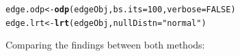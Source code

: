 \documentclass{article}\usepackage[]{graphicx}\usepackage[]{color}
\makeatletter
\newcommand{\hlnum}[1]{\textcolor[rgb]{0.686,0.059,0.569}{#1}}%
\newcommand{\hlstr}[1]{\textcolor[rgb]{0.192,0.494,0.8}{#1}}%
\newcommand{\hlstd}[1]{\textcolor[rgb]{0.345,0.345,0.345}{#1}}%
\newcommand{\hlkwb}[1]{\textcolor[rgb]{0.69,0.353,0.396}{#1}}%
\newcommand{\hlkwc}[1]{\textcolor[rgb]{0.333,0.667,0.333}{#1}}%
\newcommand{\hlkwd}[1]{\textcolor[rgb]{0.737,0.353,0.396}{\textbf{#1}}}%
\newenvironment{kframe}{%
 \def\at@end@of@kframe{}%
 \ifinner\ifhmode%
  \def\at@end@of@kframe{\end{minipage}}%
  \begin{minipage}{\columnwidth}%
 \fi\fi%
 \def\FrameCommand##1{\hskip\@totalleftmargin \hskip-\fboxsep
 \colorbox{shadecolor}{##1}\hskip-\fboxsep
     \hskip-\linewidth \hskip-\@totalleftmargin \hskip\columnwidth}%
 \MakeFramed {\advance\hsize-\width
   \@totalleftmargin\z@ \linewidth\hsize
   \@setminipage}}%
 {\par\unskip\endMakeFramed%
 \at@end@of@kframe}
\newenvironment{knitrout}{}{} %
\makeatother
\begin{document}
\begin{knitrout}
\color{fgcolor}\begin{kframe}
\begin{alltt}
\hlstd{edge.odp} \hlkwb{<-} \hlkwd{odp}\hlstd{(edgeObj,} \hlkwc{bs.its}\hlstd{=}\hlnum{100}\hlstd{,} \hlkwc{verbose}\hlstd{=}\hlnum{FALSE}\hlstd{)}
\hlstd{edge.lrt} \hlkwb{<-} \hlkwd{lrt}\hlstd{(edgeObj,} \hlkwc{nullDistn}\hlstd{=}\hlstr{"normal"}\hlstd{)}
\end{alltt}


{\ttfamily\noindent\bfseries{}}\end{kframe}
\end{knitrout}

Comparing the findings between both methods:
\end{document}
